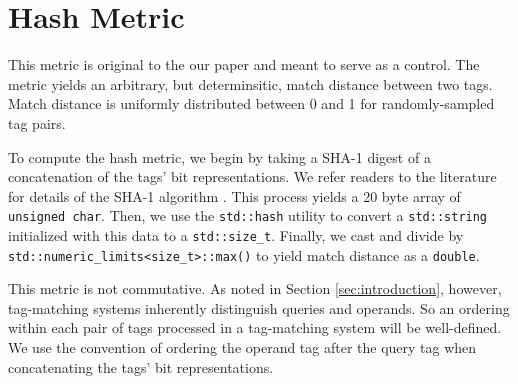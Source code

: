 \section{Hash Metric} \label{sec:hashmetric}

This metric is original to the our paper and meant to serve as a control.
The metric yields an arbitrary, but determinsitic, match distance between two tags.
Match distance is uniformly distributed between 0 and 1 for randomly-sampled tag pairs.

To compute the hash metric, we begin by taking a SHA-1 digest of a concatenation of the tags' bit representations.
We refer readers to the literature for details of the SHA-1 algorithm \citep{eastlake2001us}.
This process yields a 20 byte array of \texttt{unsigned char}.
Then, we use the \texttt{std::hash} utility to convert a \texttt{std::string} initialized with this data to a \texttt{std::size\_t}.
Finally, we cast and divide by \texttt{std::numeric\_limits<size\_t>::max()} to yield match distance as a \texttt{double}.

This metric is not commutative.
As noted in Section \ref{sec:introduction}, however, tag-matching systems inherently distinguish queries and operands.
So an ordering within each pair of tags processed in a tag-matching system will be well-defined.
We use the convention of ordering the operand tag after the query tag when concatenating the tags' bit representations.
